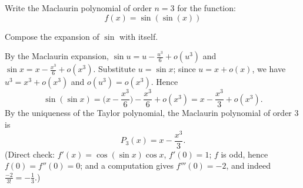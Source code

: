 
\begin{question}
Write the Maclaurin polynomial of order $n=3$ for the function:
\[ f(x)=\sin(\sin(x)) \]
\end{question}

\begin{hint}
Compose the expansion of $\sin$ with itself.
\end{hint}

\begin{solution}
By the Maclaurin expansion, $\sin u=u-\frac{u^3}{6}+o(u^3)$ and $\sin x=x-\frac{x^3}{6}+o(x^3)$. Substitute $u=\sin x$; since $u=x+o(x)$, we have $u^3=x^3+o(x^3)$ and $o(u^3)=o(x^3)$. Hence
\[ \sin(\sin x)=\Big(x-\frac{x^3}{6}\Big)-\frac{x^3}{6}+o(x^3)=x-\frac{x^3}{3}+o(x^3). \]
By the uniqueness of the Taylor polynomial, the Maclaurin polynomial of order 3 is
\[ \boxed{P_3(x)=x-\frac{x^3}{3}} . \]
(Direct check: $f'(x)=\cos(\sin x)\cos x$, $f'(0)=1$; $f$ is odd, hence $f(0)=f''(0)=0$; and a computation gives $f'''(0)=-2$, and indeed $\frac{-2}{3!}=-\frac13$.)
\end{solution}
